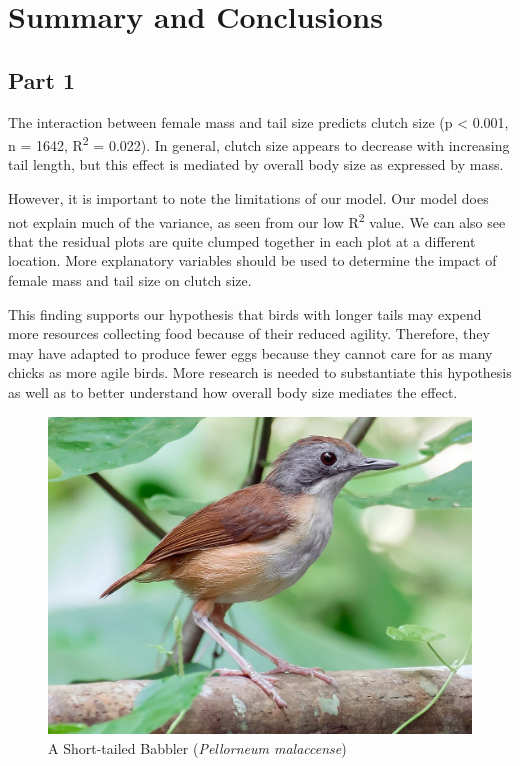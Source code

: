 \documentclass[
  12pt,
]{article}
\begin{document}
\newpage

\hypertarget{summary-and-conclusions}{%
\section{Summary and Conclusions}\label{summary-and-conclusions}}

\hypertarget{part-1}{%
\subsection{Part 1}\label{part-1}}

The interaction between female mass and tail size predicts clutch size
(p \textless{} 0.001, n = 1642, R\textsuperscript{2} = 0.022). In
general, clutch size appears to decrease with increasing tail length,
but this effect is mediated by overall body size as expressed by mass.

However, it is important to note the limitations of our model. Our model
does not explain much of the variance, as seen from our low
R\textsuperscript{2} value. We can also see that the residual plots are
quite clumped together in each plot at a different location. More
explanatory variables should be used to determine the impact of female
mass and tail size on clutch size.

This finding supports our hypothesis that birds with longer tails may
expend more resources collecting food because of their reduced agility.
Therefore, they may have adapted to produce fewer eggs because they
cannot care for as many chicks as more agile birds. More research is
needed to substantiate this hypothesis as well as to better understand
how overall body size mediates the effect.

\begin{figure}
\centering
\includegraphics{Images/short-tailed_babbler.jpeg}
\caption{A Short-tailed Babbler (\emph{Pellorneum malaccense})}
\end{figure}
\end{document}
